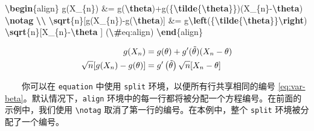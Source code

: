 \documentclass[
  12pt,
]{krantz}
\newenvironment{Shaded}{\begin{snugshade}}{\end{snugshade}}
\newcommand{\ExtensionTok}[1]{#1}
\newcommand{\KeywordTok}[1]{\textcolor[rgb]{0.13,0.29,0.53}{\textbf{#1}}}
\newcommand{\NormalTok}[1]{#1}
\newcommand{\SpecialCharTok}[1]{\textcolor[rgb]{0.81,0.36,0.00}{\textbf{#1}}}
\newcommand{\SpecialStringTok}[1]{\textcolor[rgb]{0.31,0.60,0.02}{#1}}
\theoremstyle{definition}
\theoremstyle{definition}
\theoremstyle{definition}
\theoremstyle{definition}
\theoremstyle{remark}
\begin{document}
\begin{Shaded}
\begin{Highlighting}[]
\KeywordTok{\textbackslash{}begin}\NormalTok{\{}\ExtensionTok{align}\NormalTok{\}}\SpecialStringTok{ }
\SpecialStringTok{g(X\_\{n\}) \&= g(}\SpecialCharTok{\textbackslash{}theta}\SpecialStringTok{)+g\textquotesingle{}(\{}\SpecialCharTok{\textbackslash{}tilde}\SpecialStringTok{\{}\SpecialCharTok{\textbackslash{}theta}\SpecialStringTok{\}\})(X\_\{n\}{-}}\SpecialCharTok{\textbackslash{}theta}\SpecialStringTok{) }\SpecialCharTok{\textbackslash{}notag}\SpecialStringTok{ }\SpecialCharTok{\textbackslash{}\textbackslash{}}
\SpecialCharTok{\textbackslash{}sqrt}\SpecialStringTok{\{n\}[g(X\_\{n\}){-}g(}\SpecialCharTok{\textbackslash{}theta}\SpecialStringTok{)] \&= g\textquotesingle{}}\SpecialCharTok{\textbackslash{}left}\SpecialStringTok{(\{}\SpecialCharTok{\textbackslash{}tilde}\SpecialStringTok{\{}\SpecialCharTok{\textbackslash{}theta}\SpecialStringTok{\}\}}\SpecialCharTok{\textbackslash{}right}\SpecialStringTok{)}
\SpecialStringTok{  }\SpecialCharTok{\textbackslash{}sqrt}\SpecialStringTok{\{n\}[X\_\{n\}{-}}\SpecialCharTok{\textbackslash{}theta}\SpecialStringTok{ ] (}\SpecialCharTok{\textbackslash{}\#}\SpecialStringTok{eq:align)}
\KeywordTok{\textbackslash{}end}\NormalTok{\{}\ExtensionTok{align}\NormalTok{\} }
\end{Highlighting}
\end{Shaded}

\begin{align}
g(X_{n}) &= g(\theta)+g'({\tilde{\theta}})(X_{n}-\theta) \notag \\
\sqrt{n}[g(X_{n})-g(\theta)] &= g'\left({\tilde{\theta}}\right)
  \sqrt{n}[X_{n}-\theta ] \label{eq:align}
\end{align}

  你可以在 \texttt{equation} 中使用 \texttt{split} 环境，以便所有行共享相同的编号 \eqref{eq:var-beta}。默认情况下，\texttt{align} 环境中的每一行都将被分配一个方程编号。在前面的示例中，我们使用 \texttt{\textbackslash{}notag} 取消了第一行的编号。在本例中，整个 \texttt{split} 环境被分配了一个编号。
\end{document}
